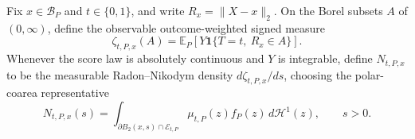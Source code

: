Fix \(x\in\mathcal B_P\) and \(t\in\{0,1\}\), and write
\(R_x=\lVert X-x\rVert_2\).  On the Borel subsets \(A\) of
\((0,\infty)\), define the observable outcome-weighted signed measure
\[
 \zeta_{t,P,x}(A)=
 \mathbb E_P\!\left[Y\mathbf 1\{T=t,\ R_x\in A\}\right].
\]
Whenever the score law is absolutely continuous and \(Y\) is integrable,
define \(N_{t,P,x}\) to be the measurable Radon--Nikodym density
\(d\zeta_{t,P,x}/ds\), choosing the polar-coarea representative
\[
 N_{t,P,x}(s)=
 \int_{\partial B_2(x,s)\cap\mathcal E_{t,P}}
 \mu_{t,P}(z)f_P(z)\,d\mathcal H^1(z),\qquad s>0.
\]